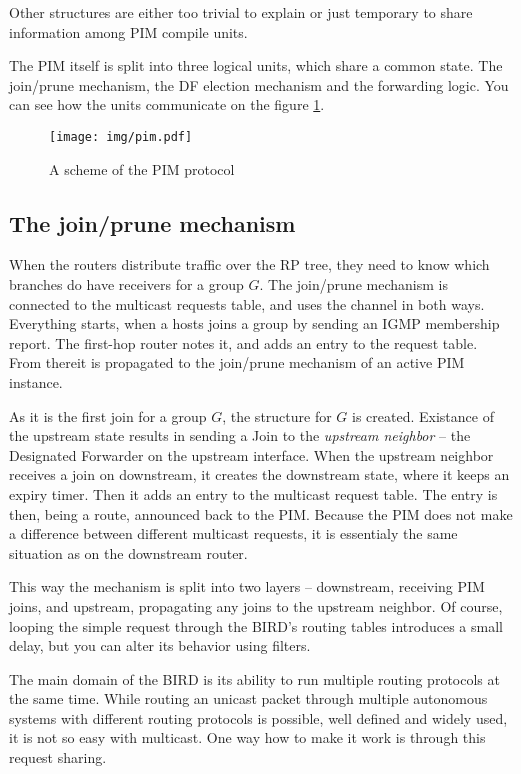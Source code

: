\noindent Other structures are either too trivial to explain or just temporary
to share information among PIM compile units.

The PIM itself is split into three logical units, which share a common state.
The join/prune mechanism, the DF election mechanism and the forwarding logic.
You can see how the units communicate on the figure \ref{pim-units}.

\begin{figure}[htp]
\centering
\texttt{[image: img/pim.pdf]}
\caption{A scheme of the PIM protocol}
\label{pim-units}
\end{figure}

\subsection{The join/prune mechanism}
When the routers distribute traffic over the RP tree, they need to know which
branches do have receivers for a group $G$. The join/prune mechanism is connected to
the multicast requests table, and uses the channel in both ways. Everything
starts, when a hosts joins a group by sending an IGMP membership report. The
first-hop router notes it, and adds an entry to the request table. From thereit is
propagated to the join/prune mechanism of an active PIM instance.

As it is the first join for a group $G$, the  structure for $G$ is
created. Existance of the upstream state results in sending a Join to the
\emph{upstream neighbor} -- the Designated Forwarder on the upstream interface.
When the upstream neighbor receives a join on downstream, it creates the
downstream state, where it keeps an expiry timer. Then it adds an entry to the
multicast request table. The entry is then, being a route, announced back to
the PIM. Because the PIM does not make a difference between different multicast
requests, it is essentialy the same situation as on the downstream router.

\label{why-pim-mreq}
This way the mechanism is split into two layers -- downstream, receiving PIM
joins, and upstream, propagating any joins to the upstream neighbor. Of course,
looping the simple request through the BIRD's routing tables introduces a small
delay, but you can alter its behavior using filters.

The main domain of the BIRD is its ability to run multiple routing protocols at
the same time. While routing an unicast packet through multiple autonomous
systems with different routing protocols is possible, well defined and widely
used, it is not so easy with multicast. One way how to make it work is through
this request sharing.

